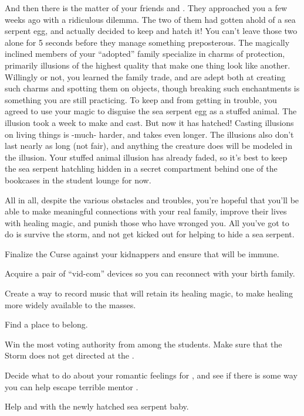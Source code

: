 \documentclass[char]{GL2020}
\begin{document}
And then there is the matter of your friends \cDisney{\full} and \cPirateChild{\full}. They approached you a few weeks ago with a ridiculous dilemma. The two of them had gotten ahold of a sea serpent egg, and actually decided to keep and hatch it! You can't leave those two alone for 5 seconds before they manage something preposterous. The magically inclined members of your ``adopted'' family specialize in charms of protection, primarily illusions of the highest quality that make one thing look like another. Willingly or not, you learned the family trade, and are adept both at creating such charms and spotting them on objects, though breaking such enchantments is something you are still practicing. To keep \cDisney{} and \cPirateChild{} from getting in trouble, you agreed to use your magic to disguise the sea serpent egg as a stuffed animal. The illusion took a week to make and cast. But now it has hatched! Casting illusions on living things is -much- harder, and takes even longer. The illusions also don't last nearly as long (not fair), and anything the creature does will be modeled in the illusion. Your stuffed animal illusion has already faded, so it's best to keep the sea serpent hatchling hidden in a secret compartment behind one of the bookcases in the student lounge for now.

All in all, despite the various obstacles and troubles, you're hopeful that you'll be able to make meaningful connections with your real family, improve their lives with healing magic, and punish those who have wronged you.  All you've got to do is survive the storm, and not get kicked out for helping to hide a sea serpent.

\begin{itemz}
	\item Finalize the Curse against your kidnappers and ensure that \cMusic{} will be immune.
	\item Acquire a pair of ``vid-com'' devices so you can reconnect with your birth family.
	\item Create a way to record music that will retain its healing magic, to make healing more widely available to the masses.
	\item Find a place to belong.
	\item Win the most voting authority from among the \pFarmers{} students. Make sure that the Storm does not get directed at the \pFarm{}.
	\item Decide what to do about your romantic feelings for \cScholarship{}, and see if there is some way you can help \cScholarship{\them} escape \cScholarship{\their} terrible mentor \cAntiChup{}.
	\item Help \cPirateChild{} and \cDisney{} with the newly hatched sea serpent baby.
\end{itemz}
\end{document}
